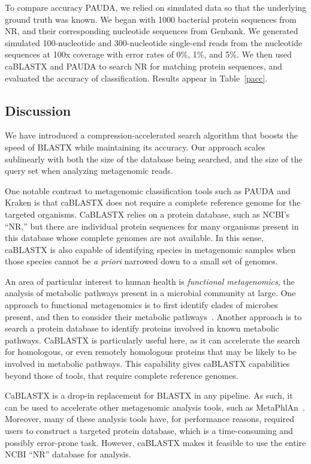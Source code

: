 \documentclass{amsbook}
\theoremstyle{definition}
\theoremstyle{remark}
\numberwithin{equation}{section}
\begin{document}
To compare accuracy PAUDA, we relied on simulated data so that the
underlying ground truth was known.
We began with 1000 bacterial protein sequences from NR, and their corresponding
nucleotide sequences from Genbank.
We generated simulated 100-nucleotide and 300-nucleotide single-end reads from
the nucleotide sequences at 100x coverage with error rates of 0\%, 1\%, and 5\%.
We then used caBLASTX and PAUDA to search NR for matching protein sequences,
and evaluated the accuracy of classification.
Results appear in Table~\ref{pacc}.

\subsection*{Discussion}

We have introduced a compression-accelerated search algorithm that boosts the
speed of BLASTX while maintaining its accuracy.
Our approach scales sublinearly with both the size of the database being
searched, and the size of the query set when analyzing metagenomic reads.

One notable contrast to metagenomic classification tools such as PAUDA and
Kraken is that caBLASTX does not require a complete reference genome for the
targeted organisms.
CaBLASTX relies on a protein database, such as NCBI's ``NR,'' but there are
individual protein sequences for many organisms present in this database whose
complete genomes are not available.
In this sense, caBLASTX is also capable of identifying species in metagenomic
samples when those species cannot be \emph{a priori} narrowed down to a small
set of genomes.

An area of particular interest to human health is \emph{functional 
metagenomics}, the analysis of metabolic pathways present in a microbial
community at large.
One approach to functional metagenomics is to first identify clades of
microbes present, and then to consider their metabolic pathways~\cite{blah}.
Another approach is to search a protein database to identify proteins involved
in known metabolic pathways.
CaBLASTX is particularly useful here, as it can accelerate the search for
homologous, or even remotely homologous proteins that may be likely to be
involved in metabolic pathways.
This capability gives caBLASTX capabilities beyond those of tools, that require
complete reference genomes.

CaBLASTX is a drop-in replacement for BLASTX in any pipeline.
As such, it can be used to accelerate other metagenomic analysis tools, such
as MetaPhlAn~\cite{blah}.
Moreover, many of these analysis tools have, for performance reasons, required
users to construct a targeted protein database, which is a time-consuming and
possibly error-prone task.
However, caBLASTX makes it feasible to use the entire NCBI ``NR'' database for
analysis.
\end{document}
